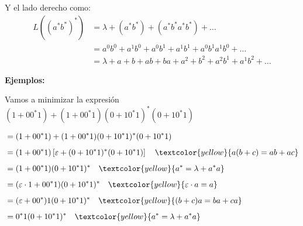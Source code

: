 Y el lado derecho como:
\begin{align*}
    L((a^*b^*)^*) &= \lambda + (a^*b^*) + (a^*b^*a^*b^*) + \dots \\
    &= a^0b^0 + a^1b^0 + a^0b^1 + a^1b^1 + a^0b^1a^1b^0  + \dots \\
    &= \lambda + a + b + ab + ba + a^2 + b^2 + a^2b^1 + a^1b^2 + \dots
\end{align*}

\textbf{Ejemplos:}

Vamos a minimizar la expresión $(1+00^*1) + (1+00^*1)(0+10^*1)^*(0+10^*1)$

\begin{align}
&= (1+00^*1) + (1+00^*1)(0+10^*1)^*(0+10^*1)  \\[0.5em]
&= (1+00^*1)\left[\varepsilon + (0+10^*1)^*(0+10^*1)\right] \quad \textcolor{yellow}{a(b + c) = ab + ac} \\[0.5em]
&= (1+00^*1)(0+10^*1)^* \quad \textcolor{yellow}{a^* = \lambda + a^*a} \\[0.5em]
&= (\varepsilon \cdot 1 + 00^*1)(0+10^*1)^* \quad \textcolor{yellow}{\varepsilon \cdot a = a} \\[0.5em]
&= (\varepsilon + 00^*)1(0+10^*1)^* \quad \textcolor{yellow}{(b+c)a = ba + ca}\\[0.5em]
&= 0^*1(0+10^*1)^* \quad \textcolor{yellow}{a^* = \lambda + a^*a}
\end{align}
